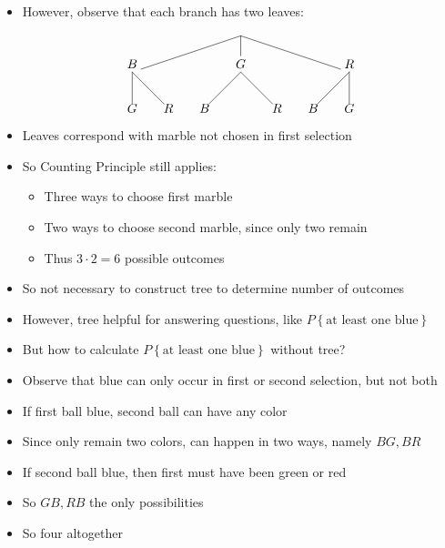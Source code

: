 \documentclass[handout]{beamer}
\theoremstyle{definition}
\begin{document}
\begin{frame}
\begin{itemize}
\item However, observe that each branch has two leaves:
\[\begin{xy}<1cm,0cm>:
(0,0)="0";
(-3,-1)="-31";
(0,-1)="01";
(3,-1)="31";
"0";"-31"*+!D{B}**\dir{-};
"0";"01"*+!D{G}**\dir{-};
"0";"31"*+!D{R}**\dir{-};
"-31";(-3,-2)*{G}**\dir{-};
"-31";(-2,-2)*{R}**\dir{-};
"01";(-1,-2)*{B}**\dir{-};
"01";(1,-2)*{R}**\dir{-};
"31";(2,-2)*{B}**\dir{-};
"31";(3,-2)*{G}**\dir{-};
\end{xy}\]
\item Leaves correspond with marble \alert{not chosen}
in first selection
\item So Counting Principle still applies:
\begin{itemize}
\item Three ways to choose first marble
\item \alert{Two} ways to choose second marble, since only two remain
\item Thus $3\cdot 2=6$ possible outcomes
\end{itemize}
\item So not necessary to construct tree to determine
number of outcomes
\item However, tree helpful for answering questions, like
$P\left\{\text{at least one blue}\right\}$
\end{itemize}
\end{frame}

\begin{frame}
\begin{itemize}
\item But how to calculate
$P\left\{\text{at least one blue}\right\}$
without tree?
\item Observe that blue can only occur in first
or second selection, but not both
\item If first ball blue, second ball can have any color
\item Since only remain two colors, can happen in two ways,
namely $BG,BR$
\item If second ball blue, then first must have been green or red
\item So $GB,RB$ the only possibilities
\item So four altogether
\end{itemize}
\end{frame}
\end{document}
